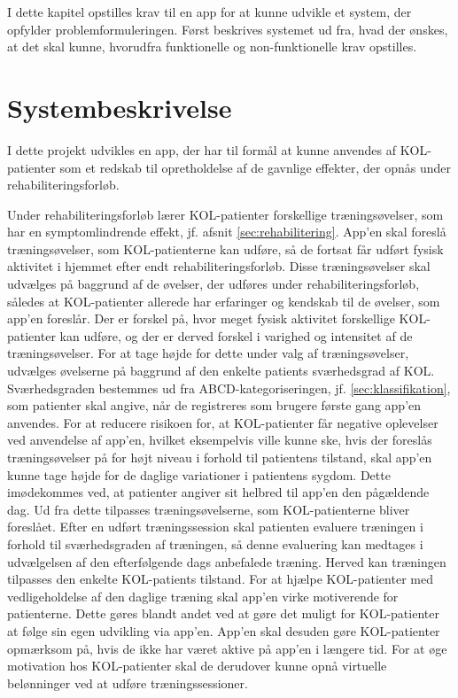 I dette kapitel opstilles krav til en app for at kunne udvikle et system, der opfylder problemformuleringen. Først beskrives systemet ud fra, hvad der ønskes, at det skal kunne, hvorudfra funktionelle og non-funktionelle krav opstilles.

\section{Systembeskrivelse} \label{sec:systembeskrivelse}
I dette projekt udvikles en app, der har til formål at kunne anvendes af KOL-patienter som et redskab til opretholdelse af de gavnlige effekter, der opnås under rehabiliteringsforløb.

Under rehabiliteringsforløb lærer KOL-patienter forskellige træningsøvelser, som har en symptomlindrende effekt, jf. afsnit \ref{sec:rehabilitering}. App’en skal foreslå træningsøvelser, som KOL-patienterne kan udføre, så de fortsat får udført fysisk aktivitet i hjemmet efter endt rehabiliteringsforløb. Disse træningsøvelser skal udvælges på baggrund af de øvelser, der udføres under rehabiliteringsforløb, således at KOL-patienter allerede har erfaringer og kendskab til de øvelser, som app’en foreslår.
Der er forskel på, hvor meget fysisk aktivitet forskellige KOL-patienter kan udføre, og der er derved forskel i varighed og intensitet af de træningsøvelser. For at tage højde for dette under valg af træningsøvelser, udvælges øvelserne på baggrund af den enkelte patients sværhedsgrad af KOL. Sværhedsgraden bestemmes ud fra ABCD-kategoriseringen, jf. \ref{sec:klassifikation}, som patienter skal angive, når de registreres som brugere første gang app'en anvendes. 
For at reducere risikoen for, at KOL-patienter får negative oplevelser ved anvendelse af app’en, hvilket eksempelvis ville kunne ske, hvis der foreslås træningsøvelser på for højt niveau i forhold til patientens tilstand, skal app’en kunne tage højde for de daglige variationer i patientens sygdom. Dette imødekommes ved, at patienter angiver sit helbred til app'en den pågældende dag.
Ud fra dette tilpasses træningsøvelserne, som KOL-patienterne bliver foreslået. Efter en udført
træningssession skal patienten evaluere træningen i forhold til sværhedsgraden af træningen,
så denne evaluering kan medtages i udvælgelsen af den efterfølgende dags anbefalede træning. Herved kan træningen tilpasses den enkelte KOL-patients tilstand.
For at hjælpe KOL-patienter med vedligeholdelse af den daglige træning skal app’en virke motiverende for patienterne. Dette gøres blandt andet ved at gøre det muligt for KOL-patienter at følge sin egen udvikling via app’en. App’en skal desuden gøre KOL-patienter opmærksom på, hvis de ikke har været aktive på app'en i længere tid. For at øge motivation hos KOL-patienter skal de derudover kunne opnå virtuelle belønninger ved at udføre træningssessioner.

